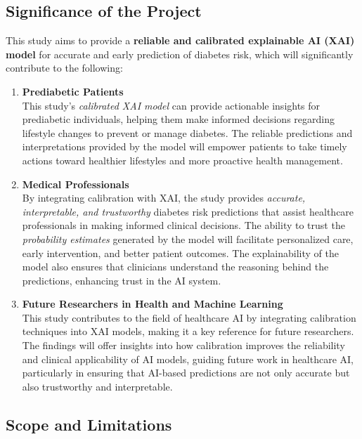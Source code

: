 \documentclass[11pt,a4paper,titlepage]{article}
\begin{document}
\subsection{Significance of the Project}

This study aims to provide a \textbf{reliable and calibrated explainable AI (XAI) model} for accurate and early prediction of diabetes risk, which will significantly contribute to the following:

\begin{enumerate}
    \item \textbf{Prediabetic Patients} \\
    This study’s \textit{calibrated XAI model} can provide actionable insights for prediabetic individuals, helping them make informed decisions regarding lifestyle changes to prevent or manage diabetes. The reliable predictions and interpretations provided by the model will empower patients to take timely actions toward healthier lifestyles and more proactive health management.

    \item \textbf{Medical Professionals} \\
    By integrating calibration with XAI, the study provides \textit{accurate, interpretable, and trustworthy} diabetes risk predictions that assist healthcare professionals in making informed clinical decisions. The ability to trust the \textit{probability estimates} generated by the model will facilitate personalized care, early intervention, and better patient outcomes. The explainability of the model also ensures that clinicians understand the reasoning behind the predictions, enhancing trust in the AI system.

    \item \textbf{Future Researchers in Health and Machine Learning} \\
    This study contributes to the field of healthcare AI by integrating calibration techniques into XAI models, making it a key reference for future researchers. The findings will offer insights into how calibration improves the reliability and clinical applicability of AI models, guiding future work in healthcare AI, particularly in ensuring that AI-based predictions are not only accurate but also trustworthy and interpretable.
\end{enumerate}


\subsection{Scope and Limitations}
\end{document}
